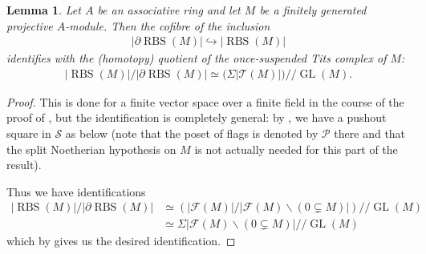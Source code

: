 \documentclass[12pt, reqno]{amsart}
\theoremstyle{plain}
\newtheorem{lemma}[theorem]{Lemma}
\theoremstyle{definition}
\begin{document}
\begin{lemma}\label{cofibre as homotopy quotient of tits complex}
Let $A$ be an associative ring and let $M$ be a finitely generated projective $A$-module. Then the cofibre of the inclusion
\begin{align*}
|\partial \operatorname{RBS}(M)|\hookrightarrow |\operatorname{RBS}(M)|
\end{align*}
identifies with the (homotopy) quotient of the once-suspended Tits complex of $M$:
\begin{align*}
|\operatorname{RBS}(M)|/|\partial\operatorname{RBS}(M)|\simeq \big(\Sigma|\mathcal{T}(M)| \big)/\!\!/\operatorname{GL}(M).
\end{align*}
\end{lemma}
\begin{proof}
This is done for a finite vector space over a finite field in the course of the proof of \cite[Theorem 5.18]{ClausenOrsnesJansen},  but the identification is completely general: by \cite[Corollary 5.8]{ClausenOrsnesJansen}, we have a pushout square in $\mathcal{S}$ as below (note that the poset of flags is denoted by $\mathcal{P}$ there and that the split Noetherian hypothesis on $M$ is not actually needed for this part of the result).
\begin{center}
\end{center}
Thus we have identifications
\begin{align*}
|\operatorname{RBS}(M)|/|\partial\operatorname{RBS}(M)|&\simeq (|\mathcal{F}(M)|/|\mathcal{F}(M)\smallsetminus (0\subsetneq M)|)/\!\!/\operatorname{GL}(M) \\
&\simeq \Sigma|\mathcal{F}(M)\smallsetminus (0\subsetneq M)|/\!\!/\operatorname{GL}(M)
\end{align*}
which by  gives us the desired identification.
\end{proof}
\end{document}
